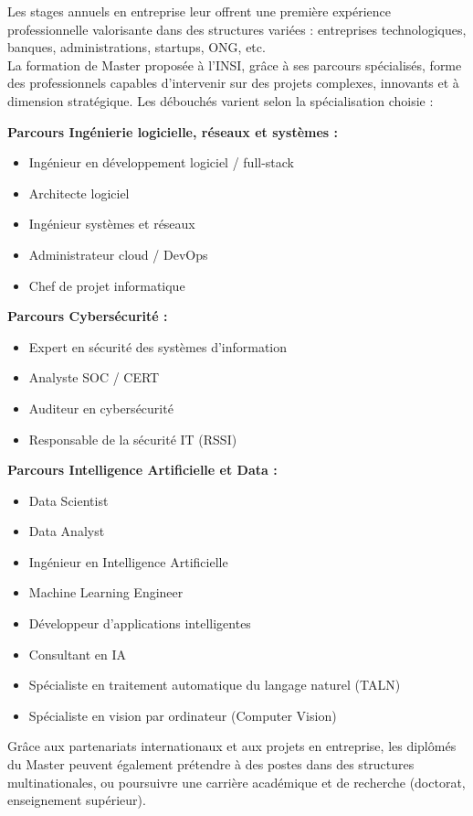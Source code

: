 \documentclass[a4paper,12pt]{book}
\begin{document}
Les stages annuels en entreprise leur offrent une première expérience professionnelle valorisante dans des structures variées : entreprises technologiques, banques, administrations, startups, ONG, etc.\\

La formation de Master proposée à l’INSI, grâce à ses parcours spécialisés, forme des professionnels capables d’intervenir sur des projets complexes, innovants et à dimension stratégique. Les débouchés varient selon la spécialisation choisie :

\textbf{Parcours Ingénierie logicielle, réseaux et systèmes :}
\begin{itemize}
    \item Ingénieur en développement logiciel / full-stack
    \item Architecte logiciel
    \item Ingénieur systèmes et réseaux
    \item Administrateur cloud / DevOps
    \item Chef de projet informatique
\end{itemize}

\textbf{Parcours Cybersécurité :}
\begin{itemize}
    \item Expert en sécurité des systèmes d'information
    \item Analyste SOC / CERT
    \item Auditeur en cybersécurité
    \item Responsable de la sécurité IT (RSSI)
\end{itemize}

\textbf{Parcours Intelligence Artificielle et Data :}
\begin{itemize}
    \item Data Scientist
    \item Data Analyst
    \item Ingénieur en Intelligence Artificielle
    \item Machine Learning Engineer
    \item Développeur d'applications intelligentes
    \item Consultant en IA
    \item Spécialiste en traitement automatique du langage naturel (TALN)
    \item Spécialiste en vision par ordinateur (Computer Vision)
\end{itemize}

Grâce aux partenariats internationaux et aux projets en entreprise, les diplômés du Master peuvent également prétendre à des postes dans des structures multinationales, ou poursuivre une carrière académique et de recherche (doctorat, enseignement supérieur).\\
\end{document}
